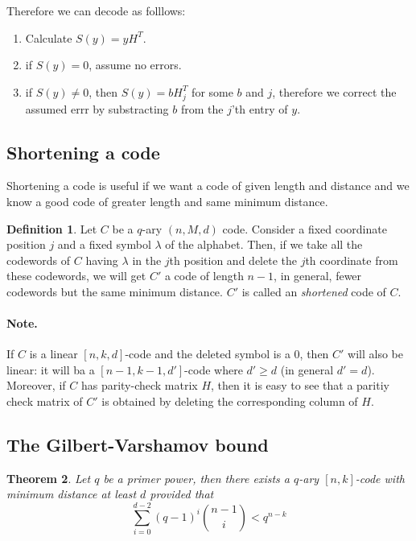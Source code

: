 \documentclass[11pt,a4paper]{article}
\theoremstyle{definition}
\newtheorem{definition}{Definition}[section]
\theoremstyle{plain}
\newtheorem{theorem}[definition]{Theorem}
\theoremstyle{remark}
\begin{document}
Therefore we can decode as folllows: 
\begin{enumerate}[label = \roman*)]
    \item Calculate $S(y) = y H^T$. 
    \item if $S(y) = 0$, assume no errors. 
    \item if $S(y) \neq 0$, then $S(y) = b H_j^T$ for some $b$ and $j$, therefore we correct the 
    assumed errr by substracting $b$ from the $j$'th entry of $y$. 
\end{enumerate}

\subsection{Shortening a code}

Shortening a code is useful if we want a code of given length and distance and we know a good code of 
greater length and same minimum distance. 

\begin{definition}
    Let $C$ be a $q$-ary $(n,M,d)$ code. Consider a fixed coordinate position $j$ and a fixed symbol 
    $\lambda$ of the alphabet. 
    Then, if we take all the codewords of $C$ having $\lambda$ in the $j$th position and delete the $j$th coordinate from these codewords, 
    we will get $C'$ a code of length $n-1$, in general, fewer codewords but the same minimum distance. 
    $C'$ is called an \emph{shortened} code of $C$. 
\end{definition}

\paragraph{Note.} If $C$ is a linear $[n,k,d]$-code and the deleted symbol is a $0$, then $C'$ will also be linear: 
it will ba a $[n-1,k-1,d']$-code where $d' \geq d$ (in general $d' = d$). 
Moreover, if $C$ has parity-check matrix $H$, then it is easy to see that a paritiy check matrix of $C'$ is obtained by deleting the corresponding 
column of $H$. 

\subsection{The Gilbert-Varshamov bound} 

\begin{theorem}\label{thm:GV-bound}
    Let $q$ be a primer power, then there exists a $q$-ary $[n,k]$-code with minimum 
    distance at least $d$ provided that 
    $$\sum_{i = 0}^{d -2} (q-1)^i \binom{n-1}{i} < q^{n-k}$$
\end{theorem}
\end{document}
